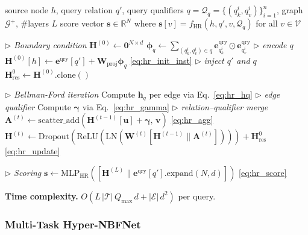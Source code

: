 \documentclass[10pt,journal,compsoc]{IEEEtran}
\begin{document}
\begin{algorithm}[t]
\caption{HR-NBFNet: Inference}
\label{alg:hrnbfnet}
\begin{algorithmic}[1]
\Require source node $h$,
  query relation $q'$,
  query qualifiers $q = \mathcal{Q}_q =
  \{(q_k^i, q_v^i)\}_{i=1}^n$,
  graph $\mathcal{G}^+$, \#layers $L$
\Ensure score vector $\mathbf{s} \in \mathbb{R}^N$
  where $\mathbf{s}[v] =
  f_{\mathrm{HR}}(h, q', v, \mathcal{Q}_q)$
  for all $v \in \mathcal{V}$

\Statex \hfill $\triangleright$ \textit{Boundary condition}
\State $\mathbf{H}^{(0)} \leftarrow \mathbf{0}^{N\times d}$
\State $\boldsymbol{\phi}_q \leftarrow
  \sum_{(q_k^i, q_v^i) \in q}
  \mathbf{e}_{q_k^i}^{\mathrm{qry}}
  \odot \mathbf{e}_{q_v^i}^{\mathrm{qry}}$
  \hfill $\triangleright$ \textit{encode $q$}
\State $\mathbf{H}^{(0)}[h] \leftarrow
  \mathbf{e}^{\mathrm{qry}}[q'] +
  \mathbf{W}_{\mathrm{proj}}\boldsymbol{\phi}_q$
  \hfill \eqref{eq:hr_init_inst}
  $\triangleright$ \textit{inject $q'$ and $q$}
\State $\mathbf{H}^0_{\mathrm{res}} \leftarrow
  \mathbf{H}^{(0)}.\mathrm{clone}()$

\Statex \hfill $\triangleright$ \textit{Bellman-Ford iteration}
  \State Compute $\mathbf{h}_q$ per edge via
    Eq.~\eqref{eq:hr_hq}
    \hfill $\triangleright$ \textit{edge qualifier}
  \State Compute $\boldsymbol{\gamma}$ via
    Eq.~\eqref{eq:hr_gamma}
    \hfill $\triangleright$ \textit{relation--qualifier merge}
  \State $\mathbf{A}^{(t)} \leftarrow
    \mathrm{scatter\_add}(
    \mathbf{H}^{(t-1)}[\mathbf{u}]
    + \boldsymbol{\gamma},\, \mathbf{v})$
    \hfill \eqref{eq:hr_agg}
  \State $\mathbf{H}^{(t)} \leftarrow
    \mathrm{Dropout}(\mathrm{ReLU}(\mathrm{LN}(
    \mathbf{W}^{(t)}[\mathbf{H}^{(t-1)}
    \|\mathbf{A}^{(t)}])))
    + \mathbf{H}^0_{\mathrm{res}}$
    \hfill \eqref{eq:hr_update}
\EndFor

\Statex \hfill $\triangleright$ \textit{Scoring}
\State \Return $\mathbf{s} \leftarrow
  \mathrm{MLP}_{\mathrm{HR}}(
  [\mathbf{H}^{(L)}\|
  \mathbf{e}^{\mathrm{qry}}[q']
  .\mathrm{expand}(N,d)])$
  \hfill \eqref{eq:hr_score}
\end{algorithmic}
\end{algorithm}

\noindent\textbf{Time complexity.}
$O(L\,|\mathcal{T}|\,Q_{\max}\,d
+ |\mathcal{E}|\,d^2)$ per query.
\subsubsection{Multi-Task Hyper-NBFNet}
\label{ssec:mthrnbfnet}
\end{document}
